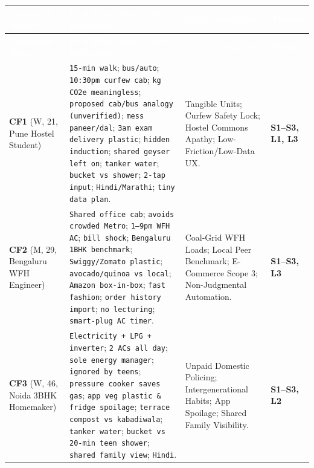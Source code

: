 \documentclass[12pt, a4paper]{article}
\begin{document}
{\footnotesize
{}
\begin{longtable}{|>{\raggedright\arraybackslash}p{3.0cm}|>{\raggedright\arraybackslash}p{7.1cm}|>{\raggedright\arraybackslash}p{3.7cm}|>{\raggedright\arraybackslash}p{1.9cm}|}
\hline
\rowcolor{cNavy}
\textcolor{white}{\textbf{Transcript Source}} & \textcolor{white}{\textbf{First-Pass Open Codes Extracted}} & \textcolor{white}{\textbf{Axial Categories}} & \textcolor{white}{\textbf{Themes}} \\
\hline
\endfirsthead
\hline
\rowcolor{cNavy}
\textcolor{white}{\textbf{Transcript Source}} & \textcolor{white}{\textbf{First-Pass Open Codes Extracted}} & \textcolor{white}{\textbf{Axial Categories}} & \textcolor{white}{\textbf{Themes}} \\
\hline
\endhead
\hline
\endfoot

\textbf{CF1} \cite{cf1} (W, 21, Pune Hostel Student) & 
\texttt{15-min walk}; \texttt{bus/auto}; \texttt{10:30pm curfew cab}; \texttt{kg CO2e meaningless}; \texttt{proposed cab/bus analogy (unverified)}; \texttt{mess paneer/dal}; \texttt{3am exam delivery plastic}; \texttt{hidden induction}; \texttt{shared geyser left on}; \texttt{tanker water}; \texttt{bucket vs shower}; \texttt{2-tap input}; \texttt{Hindi/Marathi}; \texttt{tiny data plan}. & 
Tangible Units; Curfew Safety Lock; Hostel Commons Apathy; Low-Friction/Low-Data UX. & 
\textbf{S1--S3, L1, L3} \\
\hline

\textbf{CF2} \cite{cf2} (M, 29, Bengaluru WFH Engineer) & 
\texttt{Shared office cab}; \texttt{avoids crowded Metro}; \texttt{1--9pm WFH AC}; \texttt{bill shock}; \texttt{Bengaluru 1BHK benchmark}; \texttt{Swiggy/Zomato plastic}; \texttt{avocado/quinoa vs local}; \texttt{Amazon box-in-box}; \texttt{fast fashion}; \texttt{order history import}; \texttt{no lecturing}; \texttt{smart-plug AC timer}. & 
Coal-Grid WFH Loads; Local Peer Benchmark; E-Commerce Scope 3; Non-Judgmental Automation. & 
\textbf{S1--S3, L3} \\
\hline

\textbf{CF3} \cite{cf3} (W, 46, Noida 3BHK Homemaker) & 
\texttt{Electricity + LPG + inverter}; \texttt{2 ACs all day}; \texttt{sole energy manager}; \texttt{ignored by teens}; \texttt{pressure cooker saves gas}; \texttt{app veg plastic \& fridge spoilage}; \texttt{terrace compost vs kabadiwala}; \texttt{tanker water}; \texttt{bucket vs 20-min teen shower}; \texttt{shared family view}; \texttt{Hindi}. & 
Unpaid Domestic Policing; Intergenerational Habits; App Spoilage; Shared Family Visibility. & 
\textbf{S1--S3, L2} \\
\hline


\end{longtable}}
\end{document}
